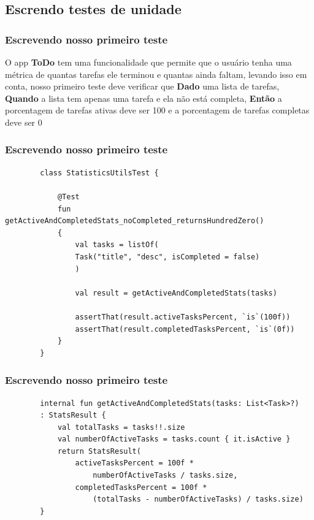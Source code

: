 \documentclass{beamer}
\begin{document}
\subsection{Escrendo testes de unidade}
\begin{frame}
	\frametitle{Escrevendo nosso primeiro teste}
	O app \textbf{ToDo} tem uma funcionalidade que permite que o usuário tenha uma métrica de quantas tarefas ele terminou e quantas ainda faltam, levando isso em conta, nosso primeiro teste deve verificar que \textbf{Dado} uma lista de tarefas, \textbf{Quando} a lista tem  apenas uma tarefa e ela não está completa, \textbf{Então} a porcentagem de tarefas ativas deve ser 100 e a porcentagem de tarefas completas deve ser 0
\end{frame}

\begin{frame}[fragile]
	\frametitle{Escrevendo nosso primeiro teste}
		\begin{example}
		\begin{lstlisting}
		class StatisticsUtilsTest {
		
			@Test
			fun getActiveAndCompletedStats_noCompleted_returnsHundredZero() 
			{
				val tasks = listOf(
				Task("title", "desc", isCompleted = false)
				)
				
				val result = getActiveAndCompletedStats(tasks)
				
				assertThat(result.activeTasksPercent, `is`(100f))
				assertThat(result.completedTasksPercent, `is`(0f))
			}
		}
		\end{lstlisting}
	\end{example}
	
\end{frame}

\begin{frame}[fragile]
	\frametitle{Escrevendo nosso primeiro teste}
	\begin{example}
		\begin{lstlisting}
		internal fun getActiveAndCompletedStats(tasks: List<Task>?)
		: StatsResult {
			val totalTasks = tasks!!.size
			val numberOfActiveTasks = tasks.count { it.isActive }
			return StatsResult(
				activeTasksPercent = 100f * 
					numberOfActiveTasks / tasks.size,
				completedTasksPercent = 100f * 
					(totalTasks - numberOfActiveTasks) / tasks.size)
		}
		\end{lstlisting}
	\end{example}
	
\end{frame}
\end{document}

